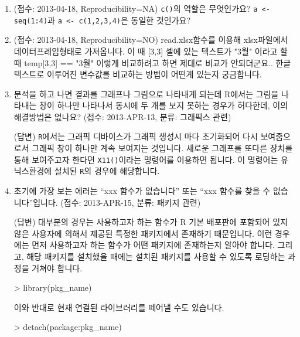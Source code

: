 \documentclass{article}
\begin{document}
\begin{enumerate}
	\item (접수: 2013-04-18, Reproducibility=NA) \texttt{c()}의 역할은 무엇인가요? \texttt{a <- seq(1:4)}과 \texttt{a <- c(1,2,3,4)}은 동일한 것인가요?
	
	\item (접수: 2013-04-18, Reproducibility=NO) read.xlsx함수를 이용해 xlsx파일에서 데이터프레임형태로 가져옵니다. 이 때 [3,3] 셀에 있는 텍스트가 "3월" 이라고 할 때 temp[3,3] == "3월" 이렇게 비교하려고 하면 제대로 비교가 안되더군요.. 한글 텍스트로 이루어진 변수값를 비교하는 방법이 어떤게 있는지 궁금합니다.
	
	\item 분석을 하고 나면 결과를 그래프나 그림으로 나타내게 되는데 R에서는 그림을 나타내는 창이 하나만 나타나서 동시에 두 개를 보지 못하는 경우가 허다한데, 이의 해결방법은 없나요? (접수: 2013-APR-13, 분류: 그래픽스 관련) 
	
	\textsf{(답변)} \texttt{R}에서는 그래픽 디바이스가 그래픽 생성시 마다 초기화되어 다시 보여줌으로서 그래픽 창이 하나만 계속 보여지는 것입니다.  새로운 그래프를 또다른 장치를 통해 보여주고자 한다면 \texttt{X11()}이라는 명령어를 이용하면 됩니다.  
	이 명령어는 유닉스환경에 설치된 \texttt{R}의 경우에 해당합니다.  
	
	\item 초기에 가장 보는 에러는 ``xxx 함수가 없습니다'' 또는 ``xxx 함수를 찾을 수 없습니다''입니다. (접수: 2013-APR-15, 분류: 패키지 관련) 
	
	\textsf{(답변)} 대부분의 경우는 사용하고자 하는 함수가 R 기본 배포판에 포함되어 있지 않은 사용자에 의해서 제공된 특정한 패키지에서 존재하기 때문입니다.  	이런 경우에는 먼저 사용하고자 하는 함수가 어떤 패키지에 존재하는지 알아야 합니다.  그리고, 해당 패키지를 설치했을 때에는 설치된 패키지를 사용할 수 있도록 로딩하는 과정을 거쳐야 합니다.

	\begin{Schunk}
	\begin{Soutput}
	> library(pkg_name)	
	\end{Soutput}
	\end{Schunk}
	
	이와 반대로 현재 연결된 라이브러리를 떼어낼 수도 있습니다. 

	\begin{Schunk}
	\begin{Soutput}
	> detach(package:pkg_name)	
	\end{Soutput}
	\end{Schunk}



\end{enumerate}
\end{document}
